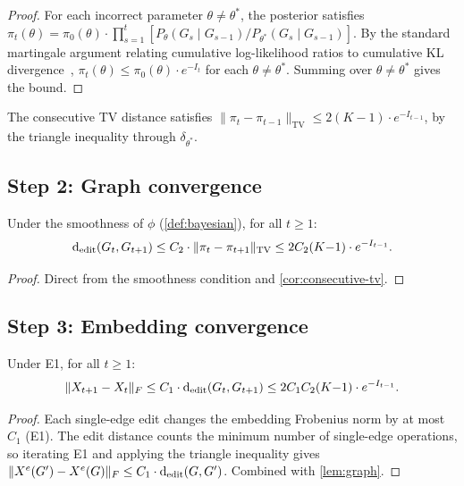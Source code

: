 \documentclass{../shared/primo}
\begin{document}
\begin{proof}
For each incorrect parameter $\theta \neq \theta^*$, the posterior satisfies $\pi_t(\theta) = \pi_0(\theta) \cdot \prod_{s=1}^{t} [P_\theta(G_s \mid G_{s-1}) / P_{\theta^*}(G_s \mid G_{s-1})]$. By the standard martingale argument relating cumulative log-likelihood ratios to cumulative KL divergence~\cite{doob1949application}, $\pi_t(\theta) \leq \pi_0(\theta) \cdot e^{-I_t}$ for each $\theta \neq \theta^*$. Summing over $\theta \neq \theta^*$ gives the bound.
\end{proof}

\begin{corollary}\label{cor:consecutive-tv}
The consecutive TV distance satisfies $\|\pi_t - \pi_{t-1}\|_{\mathrm{TV}} \leq 2(K{-}1) \cdot e^{-I_{t-1}}$, by the triangle inequality through $\delta_{\theta^*}$.
\end{corollary}

\subsection{Step 2: Graph convergence}

\begin{lemma}\label{lem:graph}
Under the smoothness of $\phi$ (\cref{def:bayesian}), for all $t \geq 1$:
\[
\operatorname{d_{edit}}(G_t, G_{t+1}) \leq C_2 \cdot \|\pi_t - \pi_{t+1}\|_{\mathrm{TV}} \leq 2C_2(K{-}1) \cdot e^{-I_{t-1}}.
\]
\end{lemma}

\begin{proof}
Direct from the smoothness condition and \cref{cor:consecutive-tv}.
\end{proof}

\subsection{Step 3: Embedding convergence}

\begin{lemma}\label{lem:embedding}
Under E1, for all $t \geq 1$:
\[
\|X_{t+1} - X_t\|_F \leq C_1 \cdot \operatorname{d_{edit}}(G_t, G_{t+1}) \leq 2C_1 C_2 (K{-}1) \cdot e^{-I_{t-1}}.
\]
\end{lemma}

\begin{proof}
Each single-edge edit changes the embedding Frobenius norm by at most $C_1$ (E1). The edit distance counts the minimum number of single-edge operations, so iterating E1 and applying the triangle inequality gives $\|X^e(G') - X^e(G)\|_F \leq C_1 \cdot \operatorname{d_{edit}}(G, G')$. Combined with \cref{lem:graph}.
\end{proof}
\end{document}
